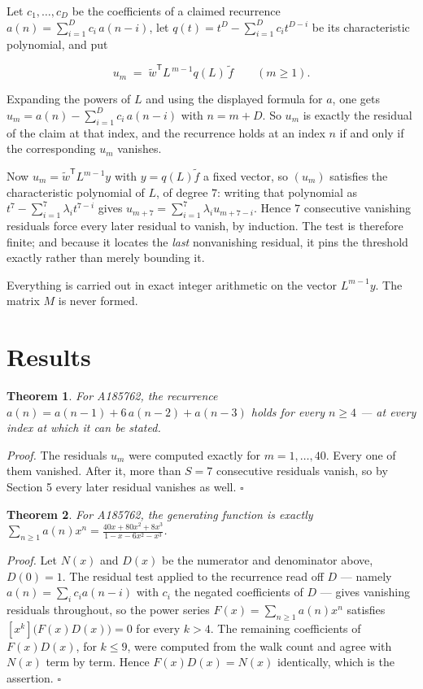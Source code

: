 \documentclass[11pt]{article}
\newtheorem{theorem}{Theorem}
\theoremstyle{definition}
\begin{document}
Let $c_1,\dots,c_D$ be the coefficients of a claimed recurrence $a(n) = \sum_{i=1}^{D} c_i\,a(n-i)$, let $q(t) = t^{D} - \sum_{i=1}^{D} c_i t^{D-i}$ be its characteristic polynomial, and put

\[u_m \;=\; \tilde w^{\mathsf T} L^{\,m-1} q(L)\,\tilde f \qquad (m \ge 1).\]

Expanding the powers of $L$ and using the displayed formula for $a$, one gets $u_m = a(n) - \sum_{i=1}^{D} c_i\,a(n-i)$ with $n = m + D$. So $u_m$ is exactly the residual of the claim at that index, and the recurrence holds at an index $n$ if and only if the corresponding $u_m$ vanishes.

Now $u_m = \tilde w^{\mathsf T} L^{m-1} y$ with $y = q(L)\tilde f$ a fixed vector, so $(u_m)$ satisfies the characteristic polynomial of $L$, of degree $7$: writing that polynomial as $t^{7} - \sum_{i=1}^{7} \lambda_i t^{7-i}$ gives $u_{m+7} = \sum_{i=1}^{7} \lambda_i u_{m+7-i}$. Hence $7$ consecutive vanishing residuals force every later residual to vanish, by induction. The test is therefore finite; and because it locates the {\itshape last} nonvanishing residual, it pins the threshold exactly rather than merely bounding it.

Everything is carried out in exact integer arithmetic on the vector $L^{m-1}y$. The matrix $M$ is never formed.

\section{Results}

\begin{theorem} For A185762, the recurrence $a(n) = a(n-1) + 6\,a(n-2) + a(n-3)$ holds for every $n \ge 4$ --- at every index at which it can be stated.\end{theorem}

{\itshape Proof.} The residuals $u_m$ were computed exactly for $m = 1,\dots,40$. Every one of them vanished. After it, more than $S = 7$ consecutive residuals vanish, so by Section 5 every later residual vanishes as well. $\square$

\begin{theorem} For A185762, the generating function is exactly $\sum_{n\ge 1} a(n)x^n = \frac{40x + 80x^{2} + 8x^{3}}{1 - x - 6x^{2} - x^{3}}$.\end{theorem}

{\itshape Proof.} Let $N(x)$ and $D(x)$ be the numerator and denominator above, $D(0)=1$. The residual test applied to the recurrence read off $D$ --- namely $a(n) = \sum_i c_i a(n-i)$ with $c_i$ the negated coefficients of $D$ --- gives vanishing residuals throughout, so the power series $F(x)=\sum_{n\ge 1}a(n)x^n$ satisfies $[x^k]\bigl(F(x)D(x)\bigr) = 0$ for every $k > 4$. The remaining coefficients of $F(x)D(x)$, for $k \le 9$, were computed from the walk count and agree with $N(x)$ term by term. Hence $F(x)D(x) = N(x)$ identically, which is the assertion. $\square$
\end{document}
